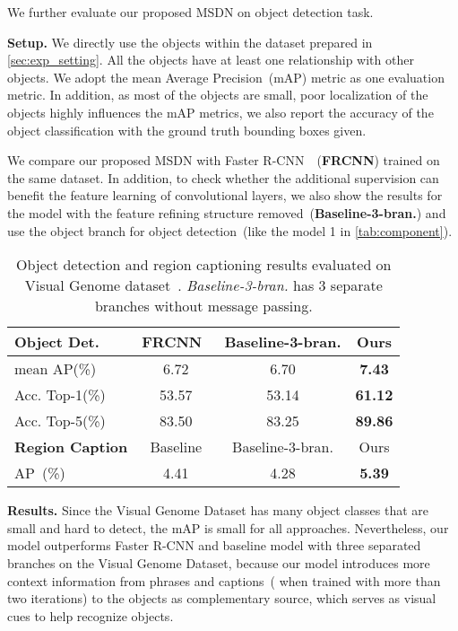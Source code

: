 We further evaluate our proposed MSDN on object detection task. 

\textbf{Setup.} We directly use the objects within the dataset prepared in \ref{sec:exp_setting}. All the objects have at least one relationship with other objects. We adopt the mean Average Precision~(mAP) metric as one evaluation metric. In addition, as most of the objects are small, poor localization of the objects highly influences the mAP metrics, we also report the accuracy of the object classification with the ground truth bounding boxes given.

We compare our proposed MSDN with Faster R-CNN~\cite{faster_rcnn}~(\textbf{FRCNN}) trained on the same dataset. In addition, to check whether the additional supervision can benefit the feature learning of convolutional layers, we also show the results for the model with the feature refining structure removed~(\textbf{Baseline-3-bran.}) and use the object branch for object detection~(like the model 1 in \ref{tab:component}). 

\begin{table}[t]
	\small
	\vspace*{-5pt}
	\begin{center}
		\begin{tabular}{l || c c c  }
			\hline 
			\textbf{Object Det.} & FRCNN~\cite{faster_rcnn} &  Baseline-3-bran. & Ours \\\hline
			mean AP(\%)    & 6.72  & 6.70  &     \textbf{7.43}   \\
			Acc. Top-1(\%)   &  53.57  &  53.14 &    \textbf{61.12}     \\
			Acc. Top-5(\%)   &  83.50 &  83.25 &  \textbf{89.86}       \\\hline\hline
			\textbf{Region Caption} & Baseline &  Baseline-3-bran. & Ours \\\hline
			AP~\cite{densecap}(\%)   & 4.41 & 4.28 &  \textbf{5.39}       \\
			\hline
		\end{tabular}
		\vspace*{-3pt}
	\end{center}
	\caption{Object detection and region captioning results evaluated on Visual Genome
		dataset~\cite{visual_genome}. \emph{Baseline-3-bran.} has 3 separate branches without message passing.}
	\label{table:other_task}
\end{table}


\textbf{Results.}  Since the Visual Genome Dataset has many object classes that are small and hard to detect, the mAP is small for all approaches. Nevertheless, our model outperforms Faster R-CNN and baseline model with three separated branches on the Visual Genome Dataset, because our model introduces more context information from phrases and captions~( when trained with more than two iterations) to the objects as complementary source, which serves as visual cues to help recognize objects. 




